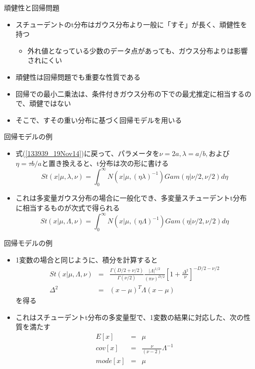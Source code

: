\begin{frame}{頑健性と回帰問題}
 \begin{itemize}
  \item スチューデントのt分布はガウス分布より一般に「すそ」が長く、\alert{頑健性}を持つ
        \begin{itemize}
         \item 外れ値となっている少数のデータ点があっても、ガウス分布よりは影響されにくい
        \end{itemize}
  \item 頑健性は回帰問題でも重要な性質である
  \item 回帰での最小二乗法は、条件付きガウス分布の下での最尤推定に相当するので、頑健ではない
  \item そこで、すその重い分布に基づく回帰モデルを用いる
 \end{itemize}
\end{frame}

\begin{frame}{回帰モデルの例}
 \begin{itemize}
  \item 式(\ref{133939_19Nov14})に戻って、パラメータを$\nu=2a,\lambda=a/b,$および$\eta=\tau b/a$と置き換えると、t分布は次の形に書ける
        \begin{equation}
         St(x|\mu,\lambda,\nu) = \int_{0}^{\infty}N(x|\mu, (\eta\lambda)^{-1})Gam(\eta|\nu/2,\nu/2)d\eta
        \end{equation}
  \item これは多変量ガウス分布の場合に一般化でき、多変量スチューデントt分布に相当するものが次式で得られる
        \begin{equation}
         St(x|\mu,\Lambda,\nu) = \int_{0}^{\infty}N(x|\mu, (\eta\Lambda)^{-1})Gam(\eta|\nu/2,\nu/2)d\eta
        \end{equation}
 \end{itemize}
\end{frame}

\begin{frame}{回帰モデルの例}
 \begin{itemize}
  \item 1変数の場合と同じように、積分を計算すると
        \begin{eqnarray}
         St(x|\mu,\Lambda,\nu) &=& \frac{\Gamma(D/2+\nu/2)}{\Gamma(\nu/2)}\frac{|\Lambda|^{1/2}}{(\pi\nu)^{D/2}}\left[1+\frac{\Delta^2}{\nu}\right]^{-D/2-\nu/2} \\
         \Delta^2&= & (x-\mu)^T\Lambda(x-\mu)
        \end{eqnarray}
        を得る
  \item これはスチューデントt分布の多変量型で、1変数の結果に対応した、次の性質を満たす
        \begin{eqnarray}
         E[x]&=&\mu\\
         cov[x]&=&\frac{\nu}{(\nu-2)}\Lambda^{-1}\\
         mode[x]& =& \mu
        \end{eqnarray}
 \end{itemize}
\end{frame}
